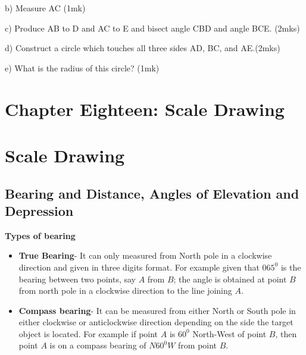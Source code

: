\documentclass[
  a4paperpaper,
]{scrbook}
\begin{document}
\begin{tcolorbox}
\begin{enumerate}
  b) Measure AC \hspace{10.8cm} (1mk)

  c) Produce AB to D and AC to E and bisect angle CBD and angle
  BCE.\hspace{1.4cm} (2mks)

  d) Construct a circle which touches all three sides AD, BC, and
  AE.\hspace{1.7cm}(2mks)

  e) What is the radius of this circle? \hspace{7.4cm} (1mk)
\end{enumerate}

\end{tcolorbox}


\hypertarget{chapter-eighteen-scale-drawing}{%
\chapter{Chapter Eighteen: Scale
Drawing}\label{chapter-eighteen-scale-drawing}}


\hypertarget{scale-drawing}{%
\chapter*{Scale Drawing}\label{scale-drawing}}


\hypertarget{bearing-and-distance-angles-of-elevation-and-depression}{%
\section{Bearing and Distance, Angles of Elevation and
Depression}\label{bearing-and-distance-angles-of-elevation-and-depression}}

\textbf{Types of bearing}

\begin{itemize}
\item
  \textbf{True Bearing}- It can only measured from North pole in a
  clockwise direction and given in three digits format. For example
  given that \(065^0\) is the bearing between two points, say \(A\) from
  \(B\); the angle is obtained at point \(B\) from north pole in a
  clockwise direction to the line joining \(A\).
\item
  \textbf{Compass bearing}- It can be measured from either North or
  South pole in either clockwise or anticlockwise direction depending on
  the side the target object is located. For example if point \(A\) is
  \(60^0\) North-West of point \(B\), then point \(A\) is on a compass
  bearing of \(N60^0W\) from point \(B\).
\end{itemize}
\end{document}

